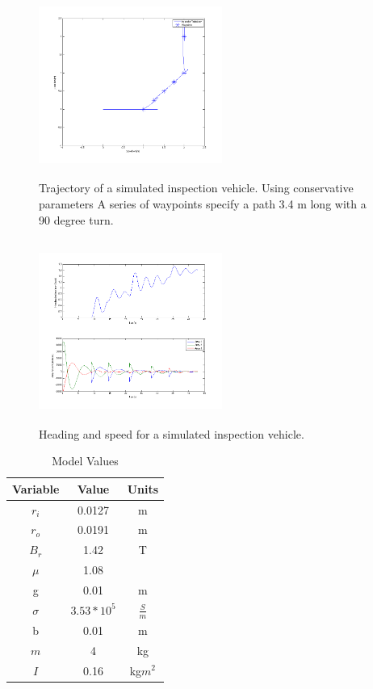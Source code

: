 \begin{figure}

\includegraphics[width = 6cm, height = 6cm ]{figures/planar_trajectory.png}
\caption{Trajectory of a simulated inspection vehicle. Using conservative parameters A series of waypoints specify a path 3.4 m long with a 90 degree turn. }
\label{fig:trajectory}
\end{figure}

\begin{figure}

\includegraphics[width = 6cm, height = 6cm ]{figures/theta_and_speed.png}
\caption{Heading and speed for a simulated inspection vehicle. }
\label{fig:theta_and_speeds}
\end{figure}



\begin{table}[ht]
\caption{Model Values} %
\centering %
\begin{tabular}{c c c} %
\hline\hline %
Variable & Value & Units\\ [0.5ex] %
\hline

$r_i$ & 0.0127 & m\\  
$r_o$ & 0.0191 & m \\
$B_r$ & 1.42 & T \\
$\mu$ & 1.08 & \\
g & 0.01 & m\\

$\sigma$ & $3.53 * 10^5$ & $\frac{S}{m}$ \\
b & 0.01 & m\\
$m$ & 4 & kg \\
$I$ & 0.16 & kg$m^2$

 \\ [1ex] %
\hline %
\end{tabular}
\label{table:values} %
\end{table}


